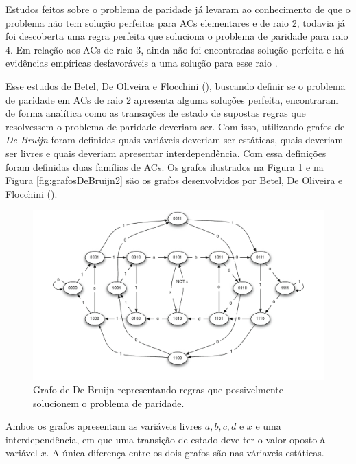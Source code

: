 \documentclass[12pt,a4paper]{article}
\begin{document}
Estudos feitos sobre o problema de paridade já levaram ao conhecimento de que o problema não tem solução perfeitas para ACs elementares e de raio 2, todavia já foi descoberta uma regra perfeita que soluciona o problema de paridade para raio 4. Em relação aos ACs de raio 3, ainda não foi encontradas solução perfeita e há evidências empíricas desfavoráveis a uma solução para esse raio \cite{Betel2013}.

Esse estudos de Betel, De Oliveira e Flocchini (\citeyear{Betel2013}), buscando definir se o problema de paridade em ACs de raio 2 apresenta alguma soluções perfeita, encontraram de forma analítica como as transações de estado de supostas regras que resolvessem o problema de paridade deveriam ser. Com isso, utilizando grafos de \textit{De Bruijn} foram definidas quais variáveis deveriam ser estáticas, quais deveriam ser livres e quais deveriam apresentar interdependência. Com essa definições foram definidas duas famílias de ACs. Os grafos ilustrados na Figura \ref{fig:grafosDeBruijn} e na Figura \ref{fig:grafosDeBruijn2} são os grafos desenvolvidos por Betel, De Oliveira e Flocchini (\citeyear{Betel2013}).

\begin{figure}[h!]
  \centering
  \includegraphics[width=.8\textwidth]{grafo1.pdf}
    \caption{Grafo de De Bruijn representando regras que possivelmente solucionem o problema de paridade.}
    \label{fig:grafosDeBruijn}
\end{figure}

Ambos os grafos apresentam as variáveis livres $a, b, c, d \text{ e } x$ e uma interdependência, em que uma transição de estado deve ter o valor oposto à variável $x$. A única diferença entre os dois grafos são nas váriaveis estáticas.
\end{document}
